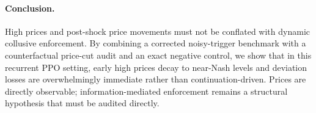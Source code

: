 \paragraph{Conclusion.}
High prices and post-shock price movements must not be conflated with dynamic collusive enforcement. By combining a corrected noisy-trigger benchmark with a counterfactual price-cut audit and an exact negative control, we show that in this recurrent PPO setting, early high prices decay to near-Nash levels and deviation losses are overwhelmingly immediate rather than continuation-driven. Prices are directly observable; information-mediated enforcement remains a structural hypothesis that must be audited directly.



